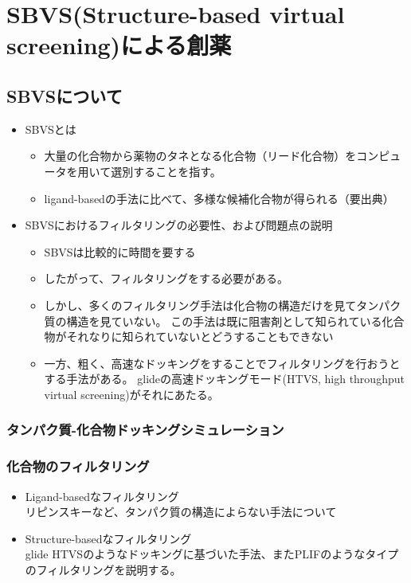 \chapter{SBVS(Structure-based virtual screening)による創薬}
\section{SBVSについて}
\begin{itemize}
\item SBVSとは
	\begin{itemize}
	\item 大量の化合物から薬物のタネとなる化合物（リード化合物）をコンピュータを用いて選別することを指す。
	\item ligand-basedの手法に比べて、多様な候補化合物が得られる（要出典）
	\end{itemize}
\item SBVSにおけるフィルタリングの必要性、および問題点の説明
	\begin{itemize}
	\item SBVSは比較的に時間を要する
	\item したがって、フィルタリングをする必要がある。
	\item しかし、多くのフィルタリング手法は化合物の構造だけを見てタンパク質の構造を見ていない。
		この手法は既に阻害剤として知られている化合物がそれなりに知られていないとどうすることもできない
	\item 一方、粗く、高速なドッキングをすることでフィルタリングを行おうとする手法がある。
		glideの高速ドッキングモード(HTVS, high throughput virtual screening)がそれにあたる。
	\end{itemize}
\end{itemize}
\subsection{タンパク質-化合物ドッキングシミュレーション}
\subsection{化合物のフィルタリング}
\begin{itemize}
\item Ligand-basedなフィルタリング\\
	リピンスキーなど、タンパク質の構造によらない手法について
\item Structure-basedなフィルタリング\\
	glide HTVSのようなドッキングに基づいた手法、またPLIFのようなタイプのフィルタリングを説明する。
\end{itemize}